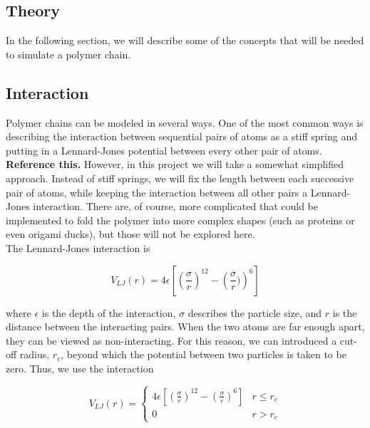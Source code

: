 \documentclass{article}
\begin{document}
\begin{multicols}{2}
\section{Theory}
\label{theory}

In the following section, we will describe some of the concepts that will be needed to simulate a polymer chain.

\subsection{Interaction}

Polymer chains can be modeled in several ways.  One of the most common ways is describing the interaction between sequential pairs of atoms as a stiff spring and putting in a Lennard-Jones potential between every other pair of atoms.  \textbf{Reference this.}  However, in this project we will take a somewhat simplified approach.  Instead of stiff springs, we will fix the length between each successive pair of atoms, while keeping the interaction between all other pairs a Lennard-Jones interaction.  There are, of course, more complicated that could be implemented to fold the polymer into more complex shapes (such as proteins or even origami ducks), but those will not be explored here.\\

The Lennard-Jones interaction is 

\begin{equation}
\label{VLJ}
V_{LJ}(r) = 4\epsilon \left [ \left ( \frac{\sigma}{r} \right ) ^{12} - \left ( \frac{\sigma}{r}) \right ) ^6 \right ]
\end{equation}

\noindent where $\epsilon$ is the depth of the interaction, $\sigma$ describes the particle size, and $r$ is the distance between the interacting pairs.  When the two atoms are far enough apart, they can be viewed as non-interacting.  For this reason, we can introduced a cut-off radius, $r_c$, beyond which the potential between two particles is taken to be zero.  Thus, we use the interaction 

\begin{equation}
V_{LJ} (r) = \begin{cases}
4 \epsilon \left [ \left (\frac{\sigma}{r} \right )^{12} - \left (\frac{\sigma}{r} \right )^{6} \right ] & r \le r_c \\
0 & r > r_c
\end{cases}
\label{cutoff}
\end{equation}


\end{multicols}
\end{document}
